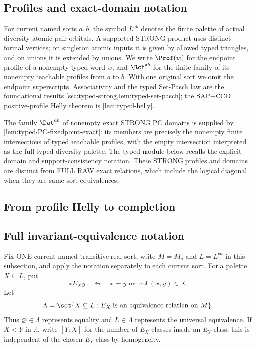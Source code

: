 \subsection{Profiles and exact-domain notation}
\label{sec:profiles}

For current named sorts $a,b$, the symbol $L^{ab}$ denotes the finite
palette of actual diversity atomic pair orbitals. A supported STRONG product
uses distinct formal vertices; on singleton atomic inputs it is given by
allowed typed triangles, and on unions it is extended by unions. We write
$\Prof(w)$ for the endpoint profile of a nonempty typed word $w$, and
$\Rch^{ab}$ for the finite family of its nonempty reachable profiles from
$a$ to $b$. With one original sort we omit the endpoint superscripts.
Associativity and the typed Set-Pasch law are the foundational results
\cref{sec:typed-strong,lem:typed-set-pasch}; the SAP+CCO positive-profile
Helly theorem is \cref{lem:typed-helly}.

The family $\Dat^{ab}$ of nonempty exact STRONG PC domains is supplied by
\cref{lem:typed-PC-fixedpoint-exact}: its members are precisely the
nonempty finite intersections of typed reachable profiles, with the empty
intersection interpreted as the full typed diversity palette. The typed
module below recalls the explicit domain and support-consistency notation.
These STRONG profiles and domains are distinct from FULL RAW exact relations,
which include the logical diagonal when they are same-sort equivalences.

\subsection{From profile Helly to completion}



\subsection{Full invariant-equivalence notation}
\label{sec:equivalences}

Fix ONE current named transitive real sort, write $M=M_a$ and
$L=L^{aa}$ in this subsection, and apply the notation separately
to each current sort. For a palette \(X\subseteq L\), put
\[
 xE_Xy\quad\Longleftrightarrow\quad x=y\text{ or }
 \operatorname{col}(x,y)\in X.
\]
Let
\[
 \Lambda=\set{X\subseteq L:E_X\text{ is an equivalence relation on }M}.
\]
Thus \(\varnothing\in\Lambda\) represents equality and \(L\in\Lambda\)
represents the universal equivalence.  If \(X<Y\) in \(\Lambda\), write
\([Y:X]\) for the number of \(E_X\)-classes inside an \(E_Y\)-class; this is
independent of the chosen \(E_Y\)-class by homogeneity.

